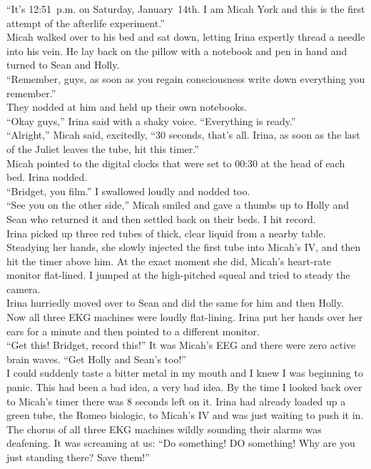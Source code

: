 \documentclass[a5paper]{scrartcl}
\begin{document}
\enquote{It's 12:51~p.m. on Saturday, January~14th. I am Micah York and this is the first attempt of the afterlife experiment.}\\
Micah walked over to his bed and sat down, letting Irina expertly thread a needle into his vein. He lay back on the pillow with a notebook and pen in hand and turned to Sean and Holly.\\
\enquote{Remember, guys, as soon as you regain consciousness write down everything you remember.}\\
They nodded at him and held up their own notebooks.\\
\enquote{Okay guys,} Irina said with a shaky voice. \enquote{Everything is ready.}\\
\enquote{Alright,} Micah said, excitedly, \enquote{30 seconds, that's all. Irina, as soon as the last of the Juliet leaves the tube, hit this timer.}\\
Micah pointed to the digital clocks that were set to 00:30 at the head of each bed. Irina nodded.\\
\enquote{Bridget, you film.} I swallowed loudly and nodded too.\\
\enquote{See you on the other side,} Micah smiled and gave a thumbs up to Holly and Sean who returned it and then settled back on their beds. I hit record.\\
Irina picked up three red tubes of thick, clear liquid from a nearby table. Steadying her hands, she slowly injected the first tube into Micah's IV, and then hit the timer above him. At the exact moment she did, Micah's heart-rate monitor flat-lined. I jumped at the high-pitched squeal and tried to steady the camera.\\
Irina hurriedly moved over to Sean and did the same for him and then Holly. Now all three EKG machines were loudly flat-lining. Irina put her hands over her ears for a minute and then pointed to a different monitor.\\
\enquote{Get this! Bridget, record this!} It was Micah's EEG and there were zero active brain waves. \enquote{Get Holly and Sean's too!}\\
I could suddenly taste a bitter metal in my mouth and I knew I was beginning to panic. This had been a bad idea, a very bad idea. By the time I looked back over to Micah's timer there was 8 seconds left on it. Irina had already loaded up a green tube, the Romeo biologic, to Micah's IV and was just waiting to push it in.\\
The chorus of all three EKG machines wildly sounding their alarms was deafening. It was screaming at us: \enquote{Do something! DO something! Why are you just standing there? Save them!}\\
\end{document}
